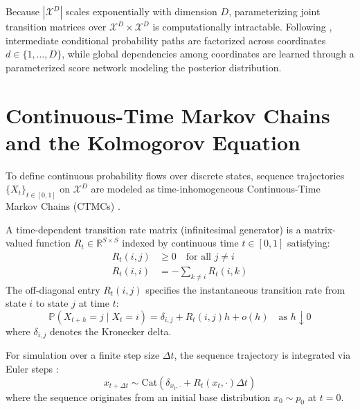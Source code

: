 Because $|\mathcal{X}^D|$ scales exponentially with dimension $D$, parameterizing joint transition matrices over $\mathcal{X}^D \times \mathcal{X}^D$ is computationally intractable. Following \citet{Campbell2024}, intermediate conditional probability paths are factorized across coordinates $d \in \{1, \dots, D\}$, while global dependencies among coordinates are learned through a parameterized score network modeling the posterior distribution.

\section{Continuous-Time Markov Chains and the Kolmogorov Equation}

To define continuous probability flows over discrete states, sequence trajectories $\{X_t\}_{t \in [0, 1]}$ on $\mathcal{X}^D$ are modeled as time-inhomogeneous Continuous-Time Markov Chains (CTMCs) \citep{Campbell2024}.

\begin{defn}
A time-dependent transition rate matrix (infinitesimal generator) is a matrix-valued function $R_t \in \mathbb{R}^{S \times S}$ indexed by continuous time $t \in [0, 1]$ satisfying:
\begin{align}
R_t(i, j) &\ge 0 \quad \text{for all } j \ne i \label{eq:rate_off_diag} \\
R_t(i, i) &= - \sum_{k \ne i} R_t(i, k) \label{eq:rate_diag_cons}
\end{align}
The off-diagonal entry $R_t(i, j)$ specifies the instantaneous transition rate from state $i$ to state $j$ at time $t$:
\begin{equation}
\mathbb{P}(X_{t+h} = j \mid X_t = i) = \delta_{i, j} + R_t(i, j) h + o(h) \quad \text{as } h \downarrow 0
\label{eq:infinitesimal_transition}
\end{equation}
where $\delta_{i, j}$ denotes the Kronecker delta.
\end{defn}

For simulation over a finite step size $\Delta t$, the sequence trajectory is integrated via Euler steps \citep{Campbell2024}:
\begin{equation}
x_{t+\Delta t} \sim \text{Cat}\left( \delta_{x_t, \cdot} + R_t(x_t, \cdot) \Delta t \right)
\label{eq:euler_step}
\end{equation}
where the sequence originates from an initial base distribution $x_0 \sim p_0$ at $t = 0$.


